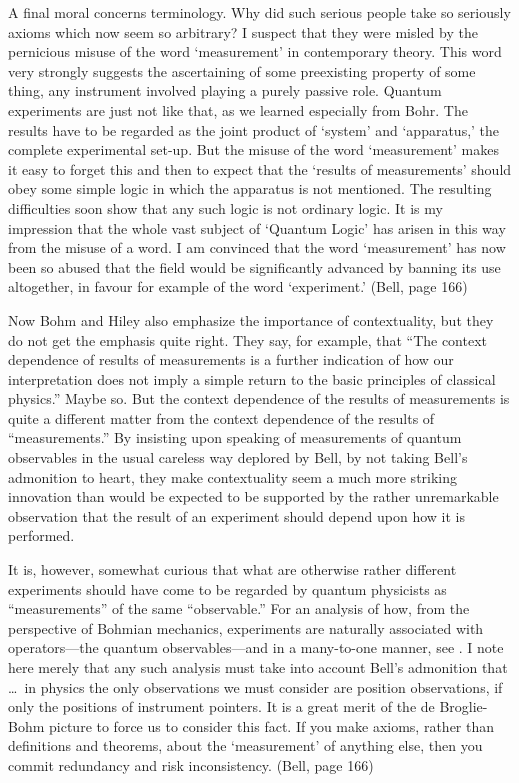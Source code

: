 \bq A final moral concerns terminology. Why did such serious people take so
seriously axioms which now seem so arbitrary? I suspect that they were
misled by the pernicious misuse of the word `measurement' in contemporary
theory. This word very strongly suggests the ascertaining of some
preexisting property of some thing, any instrument involved playing a
purely passive role. Quantum experiments are just not like that, as we
learned especially from Bohr. The results have to be regarded as the joint
product of `system' and `apparatus,' the complete experimental set-up. But
the misuse of the word `measurement' makes it easy to forget this and then
to expect that the `results of measurements' should obey some simple logic
in which the apparatus is not mentioned. The resulting difficulties soon
show that any such logic is not ordinary logic.  It is my impression that
the whole vast subject of `Quantum Logic' has arisen in this way from the
misuse of a word. I am convinced that the word `measurement' has now been
so abused that the field would be significantly advanced by banning its use
altogether, in favour for example of the word `experiment.' (Bell, page 166)
\eq

Now Bohm and Hiley also emphasize the importance of contextuality, but they
do not get the emphasis quite right. They say, for example, that ``The
context dependence of results of measurements is a further indication of
how our interpretation does not imply a simple return to the basic
principles of classical physics.'' Maybe so. But the context dependence of
the results of measurements is quite a different matter from the context
dependence of the results of ``measurements.'' By insisting upon speaking
of measurements of quantum observables in the usual careless way deplored
by Bell, by not taking Bell's admonition to heart, they make contextuality
seem a much more striking innovation than  would be expected to be
supported by the rather unremarkable observation that the result of an
experiment should depend upon how it is performed.

It is, however, somewhat curious that what are otherwise rather different
experiments should have come to be regarded by quantum physicists as
``measurements'' of the same ``observable.'' For an analysis of how, from
the perspective of Bohmian mechanics, experiments are naturally associated
with operators---the quantum observables---and in a many-to-one manner, see
\cite{DDGZ}. I note here merely that any such analysis must take into
account Bell's admonition that \bq\noindent \dots\ in physics the only
observations we must consider are position observations, if only the
positions of instrument pointers. It is a great merit of the de
Broglie-Bohm picture to force us to consider this fact. If you make axioms,
rather than definitions and theorems, about the `measurement' of anything
else, then you commit redundancy and risk inconsistency. (Bell, page 166)
\eq

